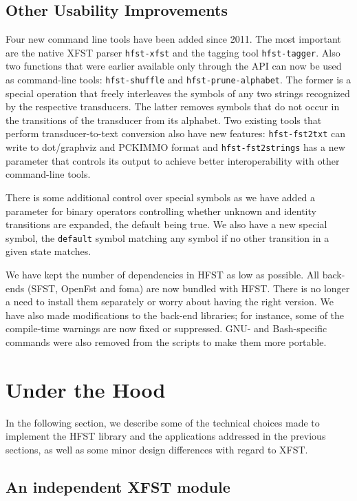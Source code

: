 \documentclass{llncs}
\begin{document}
\subsection{Other Usability Improvements}

Four new command line tools have been added since 2011. The most important are the native XFST
parser \texttt{hfst-xfst} and the tagging tool \texttt{hfst-tagger}. Also two functions
that were earlier available only through the API can now be used as
command-line tools: \texttt{hfst-shuffle} and \texttt{hfst-prune-alphabet}. The former is a special operation 
that freely interleaves the symbols of any two strings recognized by
the respective transducers.    
The latter removes symbols that do not occur in the transitions of the transducer from its alphabet. 
Two existing tools that perform transducer-to-text conversion also have new features: 
\texttt{hfst-fst2txt} can write to dot/graphviz
and PCKIMMO format and \texttt{hfst-fst2strings} has a new parameter that
controls its output to achieve better interoperability with other
command-line tools.

There is some additional control over special symbols as we have added a parameter
for binary operators controlling whether unknown and identity transitions
are expanded, the default being true. We also have a new special
symbol, the \verb+default+ symbol matching any symbol if no other
transition in a given state matches.

We have kept the number of dependencies in HFST as low as possible.
All back-ends (SFST, OpenFst and foma) are now bundled with
HFST. There is no longer a need to install them separately or worry about
having the right version. We have also made modifications to the
back-end libraries; for instance, some of the compile-time warnings are now fixed or
suppressed. GNU- and Bash-specific commands were also removed from
the scripts to make them more portable.

\section{Under the Hood}\label{hfst:solutions}

In the following section, we describe some of the technical choices made to implement
the HFST library and the applications addressed in the previous sections, as well
as some minor design differences with regard to XFST.

\subsection{An independent XFST module}
\end{document}
